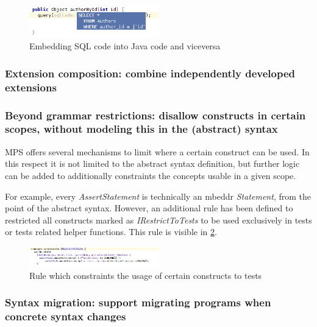 \documentclass[preprint,numbers,10pt]{sigplanconf}
\begin{document}
\begin{figure}[p]
	\centering
	\includegraphics[width=0.50\textwidth]{screens/minisql_embedded_java.png}
	\caption{Embedding SQL code into Java code and viceversa}
	\label{fig:sqlembeddingjava}
\end{figure}

\subsubsection{Extension composition: combine independently developed extensions}



\subsubsection{Beyond grammar restrictions: disallow constructs in certain scopes, without modeling this in the (abstract) syntax}

MPS offers several mechanisms to limit where a certain construct can be used. In this respect it is not limited to the abstract syntax definition, but further logic can be added to additionally constraints the concepts usable in a given scope.

For example, every \emph{AssertStatement} is technically an mbeddr \emph{Statement}, from the point of the abstract syntax. However, an additional rule has been defined to restricted all constructs marked as \emph{IRestrictToTests} to be used exclusively in tests or tests related helper functions. This rule is visible in \ref{fig:restrictedtotest}.

\begin{figure}[p]
	\centering
	\includegraphics[width=0.50\textwidth]{screens/restricted_to_test.png}
	\caption{Rule which constraints the usage of certain constructs to tests}
	\label{fig:restrictedtotest}
\end{figure}

\subsubsection{Syntax migration: support migrating programs when concrete syntax changes}
\end{document}

